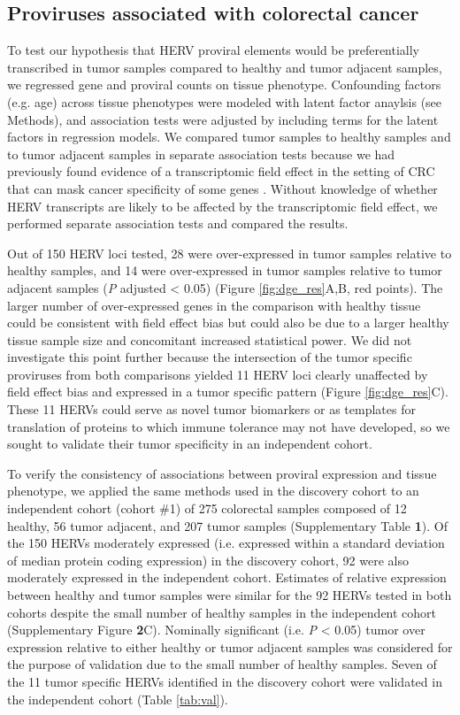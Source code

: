 \subsection*{Proviruses associated with colorectal cancer}
To test our hypothesis that HERV proviral elements would be preferentially transcribed in tumor samples compared to healthy and tumor adjacent samples, we regressed gene and proviral counts on tissue phenotype.
Confounding factors (e.g. age) across tissue phenotypes were modeled with latent factor anaylsis (see Methods), and association tests were adjusted by including terms for the latent factors in regression models.
We compared tumor samples to healthy samples and to tumor adjacent samples in separate association tests because we had previously found evidence of a transcriptomic field effect in the setting of CRC that can mask cancer specificity of some genes \citep{Dampier2020}.
Without knowledge of whether HERV transcripts are likely to be affected by the transcriptomic field effect, we performed separate association tests and compared the results.

Out of 150 HERV loci tested, 28 were over-expressed in tumor samples relative to healthy samples, and 14 were over-expressed in tumor samples relative to tumor adjacent samples (\emph{P} adjusted < 0.05) (Figure \ref{fig:dge_res}A,B, red points).
The larger number of over-expressed genes in the comparison with healthy tissue could be consistent with field effect bias but could also be due to a larger healthy tissue sample size and concomitant increased statistical power.
We did not investigate this point further because the intersection of the tumor specific proviruses from both comparisons yielded 11 HERV loci clearly unaffected by field effect bias and expressed in a tumor specific pattern (Figure \ref{fig:dge_res}C).
These 11 HERVs could serve as novel tumor biomarkers or as templates for translation of proteins to which immune tolerance may not have developed, so we sought to validate their tumor specificity in an independent cohort.

To verify the consistency of associations between proviral expression and tissue phenotype, we applied the same methods used in the discovery cohort to an independent cohort (cohort \#1) of 275 colorectal samples composed of 12 healthy, 56 tumor adjacent, and 207 tumor samples (Supplementary Table \textbf{1}).
Of the 150 HERVs moderately expressed (i.e. expressed within a standard deviation of median protein coding expression) in the discovery cohort, 92 were also moderately expressed in the independent cohort.
Estimates of relative expression between healthy and tumor samples were similar for the 92 HERVs tested in both cohorts despite the small number of healthy samples in the independent cohort (Supplementary Figure \textbf{2}C).
Nominally significant (i.e. \emph{P} < 0.05) tumor over expression relative to either healthy or tumor adjacent samples was considered for the purpose of validation due to the small number of healthy samples.
Seven of the 11 tumor specific HERVs identified in the discovery cohort were validated in the independent cohort (Table \ref{tab:val}).

